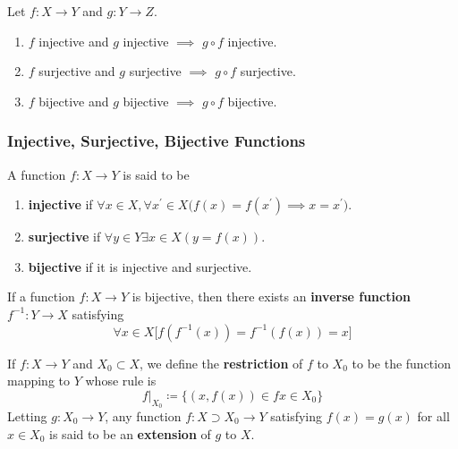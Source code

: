   \begin{theorem}[Composition]
    Let $f: X \rightarrow Y$ and $g: Y \rightarrow Z$. 
    \begin{enumerate}
      \item $f$ injective and $g$ injective $\implies$ $g \circ f$ injective. 
      \item $f$ surjective and $g$ surjective $\implies$ $g \circ f$ surjective. 
      \item $f$ bijective and $g$ bijective $\implies$ $g \circ f$ bijective. 
    \end{enumerate}
  \end{theorem}

\subsubsection{Injective, Surjective, Bijective Functions}

  \begin{definition}
    A function $f: X \rightarrow Y$ is said to be 
    \begin{enumerate}
      \item \textbf{injective} if $\forall x \in X, \forall x^\prime \in X \big( f(x) = f(x^\prime) \implies x = x^\prime \big)$. 
      \item \textbf{surjective} if $\forall y \in Y \exists x \in X (y = f(x))$. 
      \item \textbf{bijective} if it is injective and surjective. 
    \end{enumerate}
  \end{definition}

  \begin{definition}
    If a function $f: X \rightarrow Y$ is bijective, then there exists an \textbf{inverse function} $f^{-1}: Y \rightarrow X$ satisfying 
    \begin{equation}
      \forall x \in X \big[ f(f^{-1}(x)) = f^{-1} (f(x)) = x \big]
    \end{equation}
  \end{definition} 

  \begin{definition}
    If $f: X \rightarrow Y$ and $X_0 \subset X$, we define the \textbf{restriction} of $f$ to $X_0$ to be the function mapping to $Y$ whose rule is 
    \begin{equation}
      f|_{X_0} \coloneqq \{ (x, f(x)) \in f x \in X_0 \}
    \end{equation} 
    Letting $g: X_0 \rightarrow Y$, any function $f: X \supset X_0 \rightarrow Y$ satisfying $f(x) = g(x)$ for all $x \in X_0$ is said to be an \textbf{extension} of $g$ to $X$. 
  \end{definition} 

